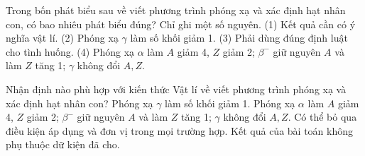 \begin{ex}
Trong bốn phát biểu sau về viết phương trình phóng xạ và xác định hạt nhân con, có bao nhiêu phát biểu đúng? Chỉ ghi một số nguyên. (1) Kết quả cần có ý nghĩa vật lí. (2) Phóng xạ $\gamma$ làm số khối giảm 1. (3) Phải dùng đúng định luật cho tình huống. (4) Phóng xạ $\alpha$ làm $A$ giảm 4, $Z$ giảm 2; $\beta^-$ giữ nguyên $A$ và làm $Z$ tăng 1; $\gamma$ không đổi $A,Z$.
\end{ex}

\begin{ex}
Nhận định nào phù hợp với kiến thức Vật lí về viết phương trình phóng xạ và xác định hạt nhân con?
\choice
{Phóng xạ $\gamma$ làm số khối giảm 1.}
{\True Phóng xạ $\alpha$ làm $A$ giảm 4, $Z$ giảm 2; $\beta^-$ giữ nguyên $A$ và làm $Z$ tăng 1; $\gamma$ không đổi $A,Z$.}
{Có thể bỏ qua điều kiện áp dụng và đơn vị trong mọi trường hợp.}
{Kết quả của bài toán không phụ thuộc dữ kiện đã cho.}
\end{ex}

